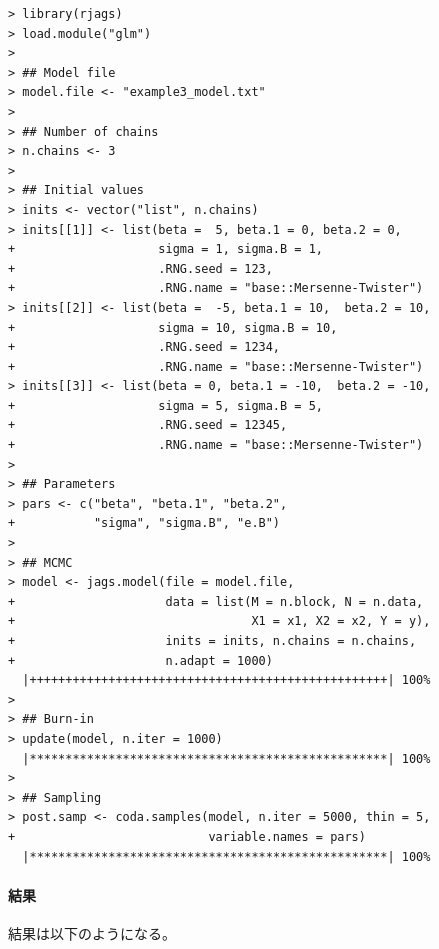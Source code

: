 \documentclass[11pt,uplatex]{jsarticle}
\begin{document}
\begin{lstlisting}
> library(rjags)
> load.module("glm")
>
> ## Model file
> model.file <- "example3_model.txt"
> 
> ## Number of chains
> n.chains <- 3
> 
> ## Initial values
> inits <- vector("list", n.chains)
> inits[[1]] <- list(beta =  5, beta.1 = 0, beta.2 = 0,
+                    sigma = 1, sigma.B = 1,
+                    .RNG.seed = 123,
+                    .RNG.name = "base::Mersenne-Twister")
> inits[[2]] <- list(beta =  -5, beta.1 = 10,  beta.2 = 10,
+                    sigma = 10, sigma.B = 10,
+                    .RNG.seed = 1234,
+                    .RNG.name = "base::Mersenne-Twister")
> inits[[3]] <- list(beta = 0, beta.1 = -10,  beta.2 = -10,
+                    sigma = 5, sigma.B = 5,
+                    .RNG.seed = 12345,
+                    .RNG.name = "base::Mersenne-Twister")
> 
> ## Parameters
> pars <- c("beta", "beta.1", "beta.2",
+           "sigma", "sigma.B", "e.B")
> 
> ## MCMC
> model <- jags.model(file = model.file,
+                     data = list(M = n.block, N = n.data,
+                                 X1 = x1, X2 = x2, Y = y),
+                     inits = inits, n.chains = n.chains,
+                     n.adapt = 1000)
  |++++++++++++++++++++++++++++++++++++++++++++++++++| 100%
>
> ## Burn-in
> update(model, n.iter = 1000)
  |**************************************************| 100%
> 
> ## Sampling
> post.samp <- coda.samples(model, n.iter = 5000, thin = 5,
+                           variable.names = pars)
  |**************************************************| 100%
\end{lstlisting}

\paragraph{結果}

結果は以下のようになる。
\end{document}

